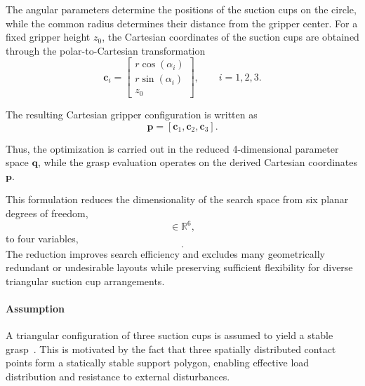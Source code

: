 The angular parameters determine the positions of the suction cups on the circle, while the common
radius determines their distance from the gripper center. For a fixed gripper height $z_0$, the
Cartesian coordinates of the suction cups are obtained through the polar-to-Cartesian transformation
\begin{equation}
    \mathbf{c}_i =
    \begin{bmatrix}
        r\cos(\alpha_i) \\
        r\sin(\alpha_i) \\
        z_0
    \end{bmatrix},
    \qquad i=1,2,3.
\end{equation}

The resulting Cartesian gripper configuration is written as
\begin{equation}
    \mathbf{p} = [\mathbf{c}_1,\mathbf{c}_2,\mathbf{c}_3].
\end{equation}

Thus, the optimization is carried out in the reduced 4-dimensional parameter space $\mathbf{q}$,
while the grasp evaluation operates on the derived Cartesian coordinates $\mathbf{p}$.

This formulation reduces the dimensionality of the search space from six planar degrees of freedom,
\begin{equation}
    [(x_1,y_1),(x_2,y_2),(x_3,y_3)] \in \mathbb{R}^6,
\end{equation}
to four variables,
\begin{equation}
    [r,\alpha_1,\alpha_2,\alpha_3].
\end{equation}
The reduction improves search efficiency and excludes many geometrically redundant or undesirable
layouts while preserving sufficient flexibility for diverse triangular suction cup arrangements.

\paragraph{Assumption}
A triangular configuration of three suction cups is assumed to yield a stable
grasp~\cite{madan2022realrobotchallenge2021}. This is motivated by the fact that three spatially
distributed contact points form a statically stable support polygon, enabling effective load
distribution and resistance to external disturbances.

